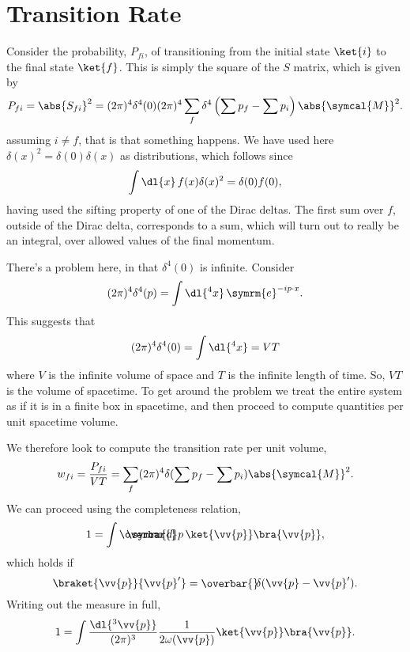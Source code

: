 \documentclass[fleqn]{NotesClass}
\newcommand{\e}{\symrm{e}}
\newcommand{\dbar}[1][0.0]{\ThisStyle{\ensurestackMath{%
            \stackengine{#1\LMex}{\SavedStyle \symrm{d}}{\SavedStyle\overbar{}%
                \mkern2.25mu}{O}{r}{F}{F}{L}}}}
\newcommand{\invariantmeasure}[1]{%
    \mathchoice{\dbar #1}{\dbar #1}{\dbar[.05] #1}{\dbar[.06] #1}
}
\newcommand\bardelta{\ThisStyle{\ensurestackMath{%
            \stackengine{-.3\LMpt}{\SavedStyle \delta}{\SavedStyle\overbar{}%
                \mkern4.5mu}{O}{r}{F}{F}{L}}}}
\newcommand{\amplitude}{\symcal{M}}
\begin{document}
    \section{Transition Rate}
    Consider the probability, \(P_{fi}\), of transitioning from the initial state \(\ket{i}\) to the final state \(\ket{f}\).
    This is simply the square of the \(S\) matrix, which is given by
    \begin{equation}
        P_{fi} = \abs{S_{fi}}^2 = (2\pi)^4\delta^4(0)(2\pi)^4 \sum_f \delta^4\left( \sum p_f - \sum p_i \right) \abs{\amplitude}^2.
    \end{equation}
    assuming \(i \ne f\), that is that something happens.
    We have used here \(\delta(x)^2 = \delta(0)\delta(x)\) as distributions, which follows since
    \begin{equation}
        \int \dl{x} \, f(x) \delta(x)^2 = \delta(0) f(0),
    \end{equation}
    having used the sifting property of one of the Dirac deltas.
    The first sum over \(f\), outside of the Dirac delta, corresponds to a sum, which will turn out to really be an integral, over allowed values of the final momentum.
    
    There's a problem here, in that \(\delta^4(0)\) is infinite.
    Consider
    \begin{equation}
        (2\pi)^4 \delta^4(p) = \int \dl{^4x}  \, \e^{-ip\cdot x}.
    \end{equation}
    This suggests that
    \begin{equation}
        (2\pi)^4\delta^4(0) = \int \dl{^4x} = VT
    \end{equation}
    where \(V\) is the infinite volume of space and \(T\) is the infinite length of time.
    So, \(VT\) is the volume of spacetime.
    To get around the problem we treat the entire system as if it is in a finite box in spacetime, and then proceed to compute quantities per unit spacetime volume.
    
    We therefore look to compute the transition rate per unit volume,
    \begin{equation}
        w_{fi} = \frac{P_{fi}}{VT} = \sum_f (2\pi)^4\delta(\sum p_f - \sum p_i) \abs{\amplitude}^2.
    \end{equation}
    We can proceed using the completeness relation,
    \begin{equation}
        1 = \int \invariantmeasure{p} \, \ket{\vv{p}}\bra{\vv{p}},
    \end{equation}
    which holds if
    \begin{equation}
        \braket{\vv{p}}{\vv{p}'} = \bardelta(\vv{p} - \vv{p}').
    \end{equation}
    Writing out the measure in full,
    \begin{equation}
        1 = \int \frac{\dl{^3\vv{p}}}{(2\pi)^3} \frac{1}{2\omega(\vv{p})} \ket{\vv{p}} \bra{\vv{p}}.
    \end{equation}
    
\end{document}
